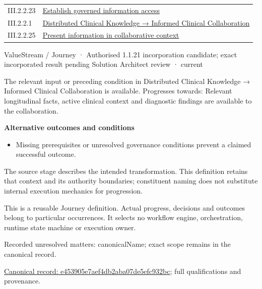 \begin{longtable}{p{.22\linewidth}p{.73\linewidth}}
III.2.2.23 & \hyperref[element:26719186d6444b5b80029fbf13ae7d06]{Establish governed information access} \\
III.2.2.1 & \hyperref[element:3ba98c0c1170458f8c02fa76694fee67]{Distributed Clinical Knowledge → Informed Clinical Collaboration} \\
III.2.2.25 & \hyperref[element:e0a57481d1d343d48abc3357053576bb]{Present information in collaborative context} \\
\end{longtable}
\label{element:e453905e7aef4db2aba07de5efc932bc}
{\small ValueStream / Journey · Authorised 1.1.21 incorporation candidate; exact incorporated result pending Solution Architect review · current}\par

The relevant input or preceding condition in Distributed Clinical Knowledge → Informed Clinical Collaboration is available. Progresses towards: Relevant longitudinal facts, active clinical context and diagnostic findings are available to the collaboration.



\par\medskip\textbf{Alternative outcomes and conditions}\par


\begin{itemize}


\item Missing prerequisites or unresolved governance conditions prevent a claimed successful outcome.

\end{itemize}


The source stage describes the intended transformation. This definition retains that context and its authority boundaries; constituent naming does not substitute internal execution mechanics for progression.



This is a reusable Journey definition. Actual progress, decisions and outcomes belong to particular occurrences. It selects no workflow engine, orchestration, runtime state machine or execution owner.


{\small Recorded unresolved matters: canonicalName; exact scope remains in the canonical record.}\par
{\footnotesize \href{../../../../../../../continuum/strategy/value-stream/e453905e7aef4db2aba07de5efc932bc.md}{Canonical record: e453905e7aef4db2aba07de5efc932bc}; full qualifications and provenance.}\par
